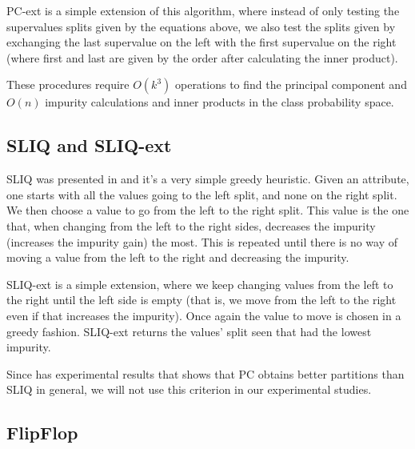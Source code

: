 PC-ext is a simple extension of this algorithm, where instead of only testing the supervalues splits given by the equations above, we also test the splits given by  exchanging the last supervalue on the left with the first supervalue on the right (where first and last are given by the order after calculating the inner product).

These procedures require $O(k^3)$ operations to find the principal component and $O(n)$ impurity calculations and inner products in the class probability space.


\subsection{SLIQ and SLIQ-ext}
SLIQ was presented in \cite{mehta1996sliq} and it's a very simple greedy heuristic. Given an attribute, one starts with all the values going to the left split, and none on the right split. We then choose a value to go from the left to the right split. This value is the one that, when changing from the left to the right sides, decreases the impurity (increases the impurity gain) the most. This is repeated until there is no way of moving a value from the left to the right and decreasing the impurity.

SLIQ-ext is a simple extension, where we keep changing values from the left to the right until the left side is empty (that is, we move from the left to the right even if that increases the impurity). Once again the value to move is chosen in a greedy fashion. SLIQ-ext returns the values' split seen that had the lowest impurity.

Since \cite{journals/datamine/CoppersmithHH99} has experimental results that shows that PC obtains better partitions than SLIQ in general, we will not use this criterion in our experimental studies.


\subsection{FlipFlop}

